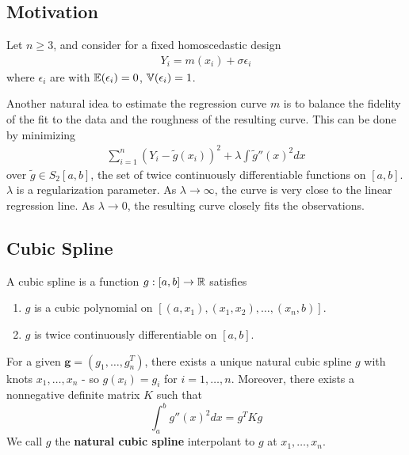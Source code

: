 \subsection{Motivation}
\label{sec:motivation}

Let $n \geq 3$, and consider for a fixed homoscedastic design
\begin{align}
  \label{eq:64}
  Y_{i} = m(x_{i}) + \sigma \epsilon_{i}
\end{align} where $\epsilon_{i}$ are \iid with $\E{\epsilon_{i}} = 0$,
$\Var{\epsilon_{i}} = 1$.

Another natural idea to estimate the regression curve $m$ is to
balance the fidelity of the fit to the data and the roughness of the
resulting curve.  This can be done by minimizing
\begin{align}
  \label{eq:65}
  \sum_{i=1}^{n} (Y_{i} - \tilde g(x_{i}))^{2} + \lambda \int \tilde
  g''(x)^{2} dx
\end{align} over $\tilde g \in S_{2}[a, b]$, the set of twice
continuously differentiable functions on $[a, b]$. $\lambda$ is a
regularization parameter. As $\lambda \rightarrow \infty$, the curve
is very close to the linear regression line. As $\lambda \rightarrow
0$, the resulting curve closely fits the observations.

\subsection{Cubic Spline}
\label{sec:cubic-spline}

\begin{defn}
  \label{defn:nonparametric_regression:2}
  A cubic spline is a function $g: [a, b] \rightarrow \mathbb{R}$ satisfies
  \begin{enumerate}
  \item $g$ is a cubic polynomial on $[(a, x_{1}), (x_{1}, x_{2}),
    \dots, (x_{n}, b)]$.
  \item $g$ is twice continuously differentiable on $[a, b]$.
  \end{enumerate}
\end{defn}

\begin{proposition}
  For a given $\mathbf{g} = (g_{1}, \dots, g_{n}^{T})$, there exists a unique
  natural cubic spline $g$ with knots $x_{1}, \dots, x_{n}$ - so
  $g(x_{i}) = g_{i}$ for $i = 1, \dots , n$.  Moreover, there exists a
  nonnegative definite matrix $K$ such that
  \begin{equation}
    \label{eq:59}
    \int_{a}^{b} g''(x)^{2}dx = g^{T}K g
  \end{equation}
  We call $g$ the \textbf{natural cubic spline} interpolant to $g$ at
  $x_{1}, \dots, x_{n}$.
\end{proposition}

